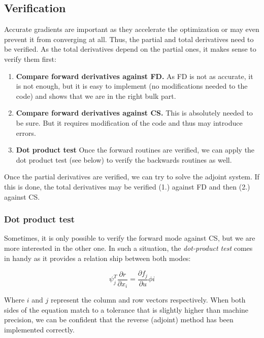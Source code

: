 \subsection{Verification}
Accurate gradients are important as they accelerate the optimization or may
even prevent it from converging at all. Thus, the partial and total derivatives
need to be verified. As the total derivatives depend on the partial ones, it
makes sense to verify them first:

\begin{enumerate}
    \item \textbf{Compare forward derivatives against FD.} As FD is not as
        accurate, it is not enough, but it is easy to implement (no
        modifications needed to the code) and shows that we are in the right
        bulk part.
    \item \textbf{Compare forward derivatives against CS.} This is absolutely
        needed to be sure. But it requires modification of the code and thus
        may introduce errors.

    \item \textbf{Dot product test} Once the forward routines are verified, we
        can apply the dot product test (see below) to verify the backwards
        routines as well.
\end{enumerate}

\noindent Once the partial derivatives are verified, we can try to solve the
adjoint system. If this is done, the total derivatives may be verified (1.)
against FD and then (2.) against CS.

\subsubsection{Dot product test}
Sometimes, it is only possible to verify the forward mode against CS, but we
are more interested in the other one. In such a situation, the
\textit{dot-product test} comes in handy as it provides a relation ship between
both modes:

\begin{equation}
    \psi_j^T \frac{\partial r}{\partial x_i} = 
    \frac{\partial f_j}{\partial u} \phi i
\end{equation}

\noindent Where $i$ and $j$ represent the column and row vectors respectively.
When both sides of the equation match to a tolerance that is slightly higher
than machine precision, we can be confident that the reverse (adjoint) method
has been implemented correctly.\cite{mdobook}








